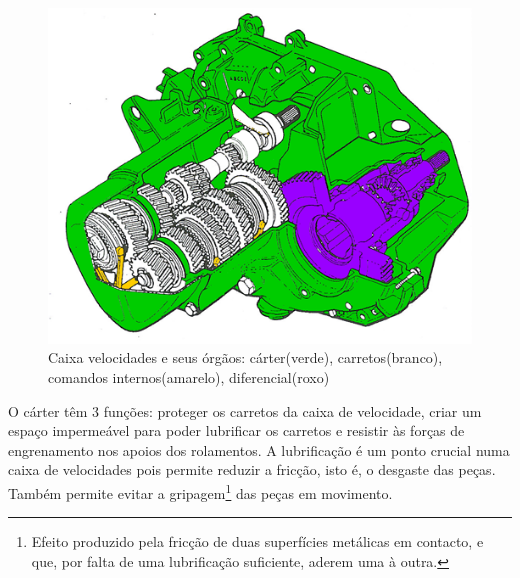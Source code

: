 \begin{figure}[H]
\centering
\includegraphics[scale=1.0]{figs/caixa}
\caption{Caixa velocidades e seus órgãos: cárter(verde), carretos(branco), comandos internos(amarelo), diferencial(roxo) \cite{formacaoCaixa}}\label{caixa_velocidades}
\end{figure}

O cárter têm 3 funções: proteger os carretos da caixa de velocidade, criar um espaço impermeável para poder lubrificar os carretos e resistir às forças de engrenamento nos apoios dos rolamentos. A lubrificação é um ponto crucial numa caixa de velocidades pois permite reduzir a fricção, isto é, o desgaste das peças. Também permite evitar a gripagem\footnote{Efeito produzido pela fricção de duas superfícies metálicas em contacto, e que, por falta de uma lubrificação suficiente, aderem uma à outra.} das peças em movimento.

